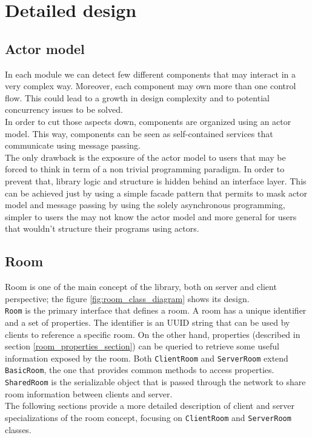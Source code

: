 \chapter{Detailed design}

\section{Actor model}

In each module we can detect few different components that may interact in a very complex way. Moreover, each component may own more than one control flow. This could lead to a growth in design complexity and to potential concurrency issues to be solved.
\\
In order to cut those aspects down, components are organized using an actor model. This way, components can be seen as self-contained services that communicate using message passing.
\\
The only drawback is the exposure of the actor model to users that may be forced to think in term of a non trivial programming paradigm. In order to prevent that, library logic and structure is hidden behind an interface layer. This can be achieved just by using a simple facade pattern that permits to mask actor model and message passing by using the solely asynchronous programming, simpler to users the may not know the actor model and more general for users that wouldn't structure their programs using actors.

\section{Room}

Room is one of the main concept of the library, both on server and client perspective; the figure \ref{fig:room_class_diagram} shows its design.
\\
\texttt{Room} is the primary interface that defines a room. A room has a unique identifier and a set of properties. The identifier is an UUID string that can be used by clients to reference a specific room. On the other hand, properties (described in section \ref{room_properties_section}) can be queried to retrieve some useful information exposed by the room.
Both \texttt{ClientRoom} and \texttt{ServerRoom} extend \texttt{BasicRoom}, the one that provides common methods to access properties.
 \\
\texttt{SharedRoom} is the serializable object that is passed through the network to share room information between clients and server.
\\
The following sections provide a more detailed description of client and server specializations of the room concept, focusing on \texttt{ClientRoom} and \texttt{ServerRoom} classes.



